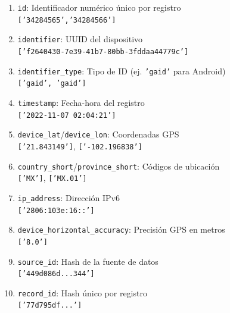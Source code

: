 \begin{enumerate}[leftmargin=*, align=left, noitemsep]
    \item \texttt{id}: Identificador numérico único por registro \\
    \footnotesize{\texttt{['34284565','34284566']}}
    \normalsize
    
    \item \texttt{identifier}: UUID del dispositivo \\ 
    \footnotesize{\texttt{['f2640430-7e39-41b7-80bb-3fddaa44779c']}}
    \normalsize

    \item \texttt{identifier\_type}: Tipo de ID (ej. \texttt{'gaid'} para Android) \\ 
    \footnotesize{\texttt{['gaid', 'gaid']}}
    \normalsize

    \item \texttt{timestamp}: Fecha-hora del registro \\ 
    \footnotesize{\texttt{['2022-11-07 02:04:21']}}
    \normalsize

    \item \texttt{device\_lat}/\texttt{device\_lon}: Coordenadas GPS \\ 
    \footnotesize{\texttt{['21.843149']}, \texttt{['-102.196838']}}
    \normalsize

    \item \texttt{country\_short}/\texttt{province\_short}: Códigos de ubicación \\ 
    \footnotesize{\texttt{['MX']}, \texttt{['MX.01']}}
    \normalsize

    \item \texttt{ip\_address}: Dirección IPv6 \\ 
    \footnotesize{\texttt{['2806:103e:16::']}}
    \normalsize

    \item \texttt{device\_horizontal\_accuracy}: Precisión GPS en metros \\ 
    \footnotesize{\texttt{['8.0']}}
    \normalsize

    \item \texttt{source\_id}: Hash de la fuente de datos \\ 
    \footnotesize{\texttt{['449d086d...344']}}
    \normalsize

    \item \texttt{record\_id}: Hash único por registro \\ 
    \footnotesize{\texttt{['77d795df...']}}
    \normalsize


\end{enumerate}
